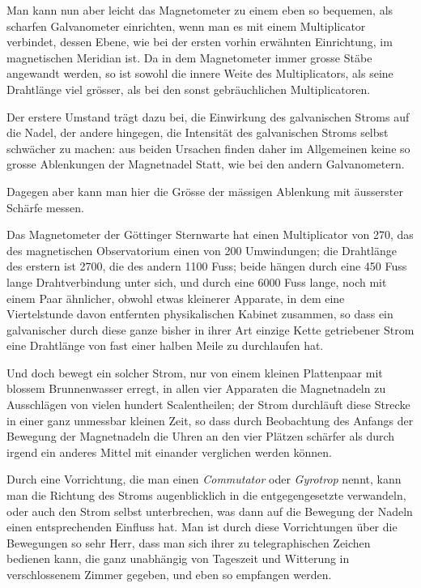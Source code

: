 \documentclass[12pt,a4paper]{article}
\begin{document}
Man kann nun aber leicht das Magnetometer zu einem eben so bequemen, als scharfen Galvanometer einrichten, wenn man es mit einem Multiplicator verbindet, dessen Ebene, wie bei der ersten vorhin erwähnten Einrichtung, im magnetischen Meridian ist. Da in dem Magnetometer immer grosse Stäbe angewandt werden, so ist sowohl die innere Weite des Multiplicators, als seine Drahtlänge viel grösser, als bei den sonst gebräuchlichen Multiplicatoren.

Der erstere Umstand trägt dazu bei, die Einwirkung des galvanischen Stroms auf die Nadel, der andere hingegen, die Intensität des galvanischen Stroms selbst schwächer zu machen: aus beiden Ursachen finden daher im Allgemeinen keine so grosse Ablenkungen der Magnetnadel Statt, wie bei den andern Galvanometern.

Dagegen aber kann man hier die Grösse der mässigen Ablenkung mit äusserster Schärfe messen.

Das Magnetometer der Göttinger Sternwarte hat einen Multiplicator von 270, das des magnetischen Observatorium einen von 200 Umwindungen; die Drahtlänge des erstern ist 2700, die des andern 1100 Fuss; beide hängen durch eine 450 Fuss lange Drahtverbindung unter sich, und durch eine 6000 Fuss lange, noch mit einem Paar ähnlicher, obwohl etwas kleinerer Apparate, in dem eine Viertelstunde davon entfernten physikalischen Kabinet zusammen, so dass ein galvanischer durch diese ganze bisher in ihrer Art einzige Kette getriebener Strom eine Drahtlänge von fast einer halben Meile zu durchlaufen hat.

Und doch bewegt ein solcher Strom, nur von einem kleinen Plattenpaar mit blossem Brunnenwasser erregt, in allen vier Apparaten die Magnetnadeln zu Ausschlägen von vielen hundert Scalentheilen; der Strom durchläuft diese Strecke in einer ganz unmessbar kleinen Zeit, so dass durch Beobachtung des Anfangs der Bewegung der Magnetnadeln die Uhren an den vier Plätzen schärfer als durch irgend ein anderes Mittel mit einander verglichen werden können.

Durch eine Vorrichtung, die man einen \textit{Commutator} oder \textit{Gyrotrop} nennt, kann man die Richtung des Stroms augenblicklich in die entgegengesetzte verwandeln, oder auch den Strom selbst unterbrechen, was dann auf die Bewegung der Nadeln einen entsprechenden Einfluss hat. Man ist durch diese Vorrichtungen über die Bewegungen so sehr Herr, dass man sich ihrer zu telegraphischen Zeichen bedienen kann, die ganz unabhängig von Tageszeit und Witterung in verschlossenem Zimmer gegeben, und eben so empfangen werden.
\end{document}
